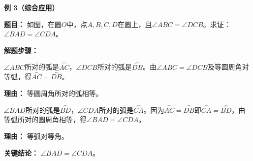\begin{examplebox}
	\medskip
	\textbf{\textcolor{CExample}{例 3（综合应用）}}

	\textbf{\textcolor{CExample}{题目：}}
	如图，在圆$O$中，点$A,B,C,D$在圆上，且$\angle ABC = \angle DCB$。求证：$\angle BAD = \angle CDA$。

	\textbf{\textcolor{CExample}{解题步骤：}}
	\begin{description}[style=nextline, leftmargin=2.8em, labelsep=0.5em, itemsep=0.45em]
		\item[\textbf{第一步（等角推等弧）：}] $\angle ABC$所对的弧是$\overset{\frown}{AC}$，$\angle DCB$所对的弧是$\overset{\frown}{DB}$。由$\angle ABC = \angle DCB$及等圆周角对等弧，得$\overset{\frown}{AC} = \overset{\frown}{DB}$。
			\par\textbf{理由：} 等圆周角所对的弧相等。
		\item[\textbf{第二步（等弧推等角）：}] $\angle BAD$所对的弧是$\overset{\frown}{BD}$，$\angle CDA$所对的弧是$\overset{\frown}{CA}$。因为$\overset{\frown}{AC} = \overset{\frown}{DB}$即$\overset{\frown}{CA} = \overset{\frown}{BD}$，由等弧所对的圆周角相等，得$\angle BAD = \angle CDA$。
			\par\textbf{理由：} 等弧对等角。
	\end{description}
	\textbf{\textcolor{CExample}{关键结论：}}
	$\angle BAD = \angle CDA$。
\end{examplebox}
